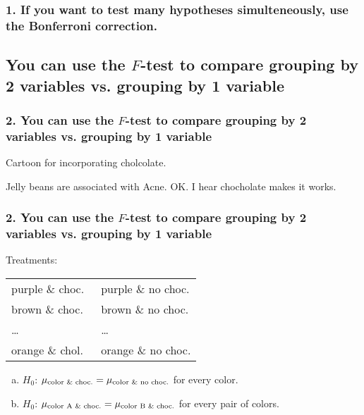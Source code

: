 \documentclass[slidestop,compress,mathserif,12pt,t,professionalfonts,xcolor=table]{beamer}
\newcommand{\mainideaA}{You can use the $F$-test to compare grouping by 2 variables vs. grouping by 1 variable}
\newcommand{\bonferroni}{If you want to test many hypotheses simulteneously, use
  the Bonferroni correction.}
\begin{document}

\begin{frame}
  \frametitle{1. \bonferroni}

\vfill


\vfill

\end{frame}



\subsection{\mainideaA}
\label{mi1}


\begin{frame}
  \frametitle{2. \mainideaA}

  Cartoon for incorporating cholcolate.

  Jelly beans are associated with Acne.
  OK.
  I hear chocholate makes it works.

\end{frame}


\begin{frame}
  \frametitle{2. \mainideaA}

  Treatments:

  \begin{center}
  \begin{tabular}{l l}
    purple \& choc.\ & purple \& no choc. \\
    brown \& choc.\ & brown \& no choc. \\
    \ldots & \ldots \\
    orange \& chol.\ & orange \& no choc.
    \end{tabular}
    \end{center}

    \begin{enumerate}[(a)]
      \item $H_0$: $\mu_{\textmd{color \& choc.}} = \mu_{\textmd{color \& no choc.}}$ for every color.
      \item $H_0$: $\mu_{\textmd{color A \& choc.}} = \mu_{\textmd{color B \& choc.}}$ for every pair of colors.
      \end{enumerate}

\end{frame}
\end{document}
